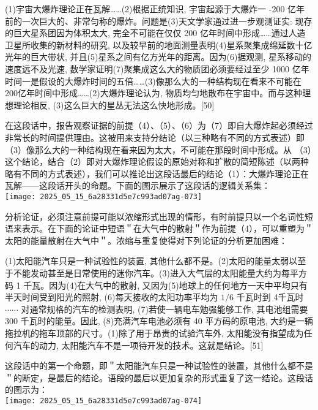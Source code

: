 \begin{displayquote}
(1)宇宙大爆炸理论正在瓦解……(2)根据正统知识, 宇宙起源于大爆炸一 -200 亿年前的一次巨大的、非常匀称的爆炸。问题是(3)天文学家通过进一步观测证实: 现存的巨大星系团因为体积太大, 完全不可能在仅仅 200 亿年时间中形成……通过人造卫星所收集的新材料的研究, 以及较早前的地面测量表明(4)星系聚集成绵延数十亿光年的巨大带状, 并且(5)星系之间有亿方光年的距离。因为(6)据观测, 星系移动的速度远不及光速, 数学家证明(7)聚集成这么大的物质团必须要经过至少 1000 亿年时间一是假设的大爆炸时间的五倍……(3)像那么大的一种结构现在看来不可能在 200亿年时间中形成……(2)大爆炸理论认为, 物质均匀地散布在宇宙中。而与这种理想理论相反, (3)这么巨大的星丛无法这么快地形成。[50]
\end{displayquote}

在这段话中，报告观察证据的前提（4）、（5）、（6）为（7）即自大爆炸起必须经过非常长的时间提供理由。这被用来支持分结论（以三种略有不同的方式表述）即（3）像那么大的一种结构现在看来因为太大，不可能在那段时间中形成。从 （3）这个结论，结合（2）即对大爆炸理论假设的原始对称和扩散的简短陈述（以两种略有不同的方式表述），我们可以推论出这段话最后的结论（1）：大爆炸理论正在瓦解——这段话开头的命题。下面的图示展示了这段话的逻辑关系集：\\
\texttt{[image: 2025\_05\_15\_6a28331d5e7c993ad07ag-073]}

分析论证，必须注意前提可能以浓缩形式出现的情形，有时前提只以一个名词性短语来表示。在下面的论证中短语＂在大气中的散射＂作为前提（4），可以重塑为＂太阳的能量散射在大气中＂。浓缩与重复使得对下列论证的分析更加困难：

\begin{displayquote}
(1)太阳能汽车只是一种试验性的装置, 其他什么都不是。(2)太阳的能量太弱以至于不能发动甚至是日常使用的迷你汽车。(3)进入大气层的太阳能量大约为每平方码 1 千瓦。因为(4)在大气中的散射, 又因为(5)地球上的任何地方一天中平均只有半天时间受到阳光的照射, (6)每天接收的太阳功率平均为 $1 / 6$ 千瓦时到 4千瓦时 $\cdots \cdots$ 对通常规格的汽车的检测表明, (7)若使一辆电车勉强能够工作, 其电池组需要 300 千瓦时的能量。因此, (8)充满汽车电池必须有 40 平方码的原电池, 大约是一辆拖拉机的拖车顶部的尺寸。(1)除了用于昂贵的试验汽车外, 太阳能没有指望成为任何汽车的动力, 太阳能汽车不是一项待开发的技术。这就是结论。[51]
\end{displayquote}

这段话中的第一个命题，即＂太阳能汽车只是一种试验性的装置，其他什么都不是＂的断定，是最后的结论。语段的最后以更加复杂的形式重复了这一结论。这段话的图示为：\\
\texttt{[image: 2025\_05\_15\_6a28331d5e7c993ad07ag-074]}


